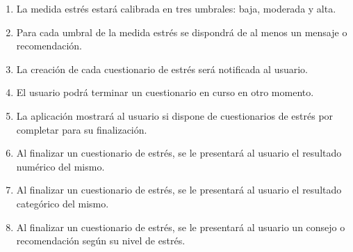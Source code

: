 \begin{enumerate}[series=req-usuario,label=\textbf{\texttt{RU-\arabic*}}]
\begin{enumerate}[series=req-funcionales,label=\textbf{\texttt{RF-\arabic*}}]
                \item La medida estrés estará calibrada en tres umbrales: baja, moderada y alta.
                \item Para cada umbral de la medida estrés se dispondrá de al menos un mensaje o recomendación.
                \item La creación de cada cuestionario de estrés será notificada al usuario.
                \item El usuario podrá terminar un cuestionario en curso en otro momento.
                \item La aplicación mostrará al usuario si dispone de cuestionarios de estrés por completar para su finalización.
                \item Al finalizar un cuestionario de estrés, se le presentará al usuario el resultado numérico del mismo.
                \item Al finalizar un cuestionario de estrés, se le presentará al usuario el resultado categórico del mismo.
                \item Al finalizar un cuestionario de estrés, se le presentará al usuario un consejo o recomendación según su nivel de estrés.
            \end{enumerate}
        \end{enumerate}
